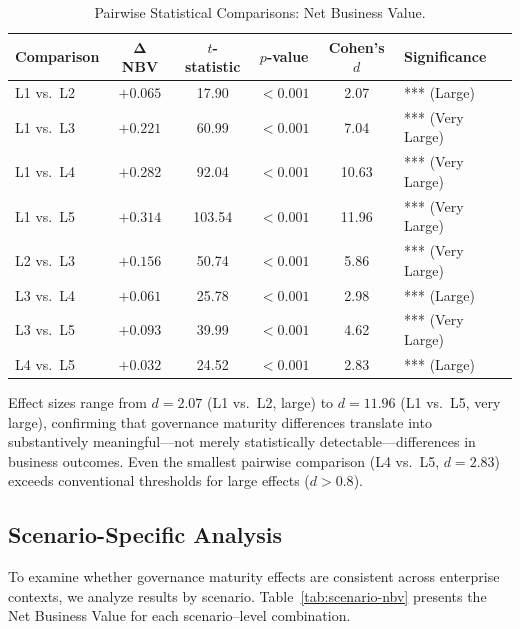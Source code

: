 \documentclass[ai,article,submit,pdftex,moreauthors]{Definitions/mdpi}
\begin{document}
\begin{table}[htbp]
\caption{Pairwise Statistical Comparisons: Net Business Value.}\label{tab:pairwise}
\centering
\small
\begin{tabular}{l c c c c l}
\toprule
\textbf{Comparison} & $\boldsymbol{\Delta}$ \textbf{NBV} & \textbf{$t$-statistic} & \textbf{$p$-value} & \textbf{Cohen's $d$} & \textbf{Significance} \\
\midrule
L1 vs.\ L2 & $+0.065$ & 17.90  & $< 0.001$ & 2.07  & *** (Large) \\
L1 vs.\ L3 & $+0.221$ & 60.99  & $< 0.001$ & 7.04  & *** (Very Large) \\
L1 vs.\ L4 & $+0.282$ & 92.04  & $< 0.001$ & 10.63 & *** (Very Large) \\
L1 vs.\ L5 & $+0.314$ & 103.54 & $< 0.001$ & 11.96 & *** (Very Large) \\
L2 vs.\ L3 & $+0.156$ & 50.74  & $< 0.001$ & 5.86  & *** (Very Large) \\
L3 vs.\ L4 & $+0.061$ & 25.78  & $< 0.001$ & 2.98  & *** (Large) \\
L3 vs.\ L5 & $+0.093$ & 39.99  & $< 0.001$ & 4.62  & *** (Very Large) \\
L4 vs.\ L5 & $+0.032$ & 24.52  & $< 0.001$ & 2.83  & *** (Large) \\
\bottomrule
\end{tabular}
\end{table}

Effect sizes range from $d = 2.07$ (L1 vs.\ L2, large) to $d = 11.96$ (L1 vs.\ L5, very large), confirming that governance maturity differences translate into substantively meaningful---not merely statistically detectable---differences in business outcomes. Even the smallest pairwise comparison (L4 vs.\ L5, $d = 2.83$) exceeds conventional thresholds for large effects ($d > 0.8$).

\subsection{Scenario-Specific Analysis}\label{sec:results-scenario}

To examine whether governance maturity effects are consistent across enterprise contexts, we analyze results by scenario. Table~\ref{tab:scenario-nbv} presents the Net Business Value for each scenario--level combination.
\end{document}

